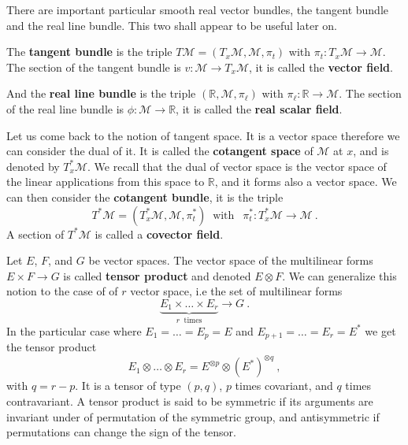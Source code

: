 \documentclass[12pt]{book}
\newcommand{\Mcal}{\mathcal{M}}
\newcommand{\Rbb}{\mathbb{R}}
\theoremstyle{break}
\begin{document}


There are important particular smooth real vector bundles, the tangent bundle and the real line bundle. This two shall appear to be useful later on. 




The \textbf{tangent bundle} is the triple $T\Mcal=(T_x\Mcal, \Mcal, \pi_t)$ with $\pi_t : T_x\Mcal \to \Mcal$. The section of the tangent bundle is $v : \Mcal \to T_x\Mcal$, it is called the \textbf{vector field}. 




And the \textbf{real line bundle} is the triple $(\Rbb, \Mcal, \pi_\ell)$ with $\pi_\ell : \Rbb \to \Mcal$. The section of the real line bundle is $\phi : \Mcal \to \Rbb$, it is called the \textbf{real scalar field}. 




Let us come back to the notion of tangent space. It is a vector space therefore we can consider the dual of it. It is called the \textbf{cotangent space} of $\Mcal$ at $x$, and is denoted by $T^\ast_x\Mcal$. We recall that the dual of vector space is the vector space of the linear applications from this space to $\Rbb$, and it forms also a vector space. We can then consider the \textbf{cotangent bundle}, it is the triple
%
\begin{equation*}
T^\ast\Mcal=(T^\ast_x\Mcal, \Mcal, \pi^\ast_t) \ \mbox{ with } \ \ \pi^\ast_t : T^\ast_x\Mcal \to \Mcal \ .
\end{equation*}
%
A section of $T^\ast\Mcal$ is called a \textbf{covector field}.




Let $E$, $F$, and $G$ be vector spaces. The vector space of the multilinear forms $E \times F \to G$ is called \textbf{tensor product} and denoted $E \otimes F$. We can generalize this notion to the case of of $r$ vector space, i.e the set of multilinear forms
%
\begin{equation*}
\underbrace{E_1 \times \dots \times E_r}_{r \ \mbox{ times}} \to G \ .
\end{equation*}
%
In the particular case where $E_1 = \dots = E_p = E$ and $E_{p+1} = \dots = E_r = E^\ast$ we get the tensor product 
%
\begin{equation*}
E_1 \otimes \dots \otimes E_r = E^{\otimes p} \otimes (E^\ast)^{\otimes q} \ ,
\end{equation*}
%
with $q=r-p$. It is a tensor of type $(p,q)$, $p$ times covariant, and $q$ times contravariant. A tensor product is said to be symmetric if its arguments are invariant under of permutation of the symmetric group, and antisymmetric if permutations can change the sign of the tensor.
\end{document}

